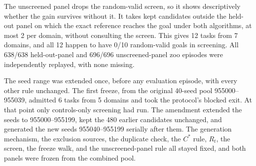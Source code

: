 The unscreened panel drops the random-valid screen, so it shows descriptively whether the gain survives without it. It takes kept candidates outside the held-out panel on which the exact reference reaches the goal under both algorithms, at most 2 per domain, without consulting the screen. This gives 12 tasks from 7 domains, and all 12 happen to have 0/10 random-valid goals in screening. All 638/638 held-out-panel and 696/696 unscreened-panel zoo episodes were independently replayed, with none missing.

The seed range was extended once, before any evaluation episode, with every other rule unchanged. The first freeze, from the original 40-seed pool 955000--955039, admitted 6 tasks from 5 domains and took the protocol's blocked exit. At that point only controls-only screening had run. The amendment extended the seeds to 955000--955199, kept the 480 earlier candidates unchanged, and generated the new seeds 955040--955199 serially after them. The generation mechanism, the exclusion sources, the duplicate check, the $C^*$ rule, $R_t$, the screen, the freeze walk, and the unscreened-panel rule all stayed fixed, and both panels were frozen from the combined pool.


